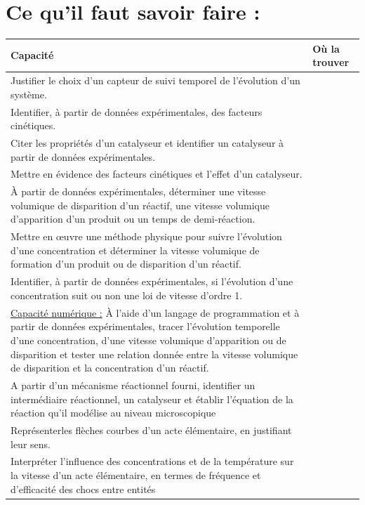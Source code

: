 \documentclass[a4paper,11pt,fleqn]{article}%
\begin{document}
\section*{Ce qu'il faut savoir faire :}
\begin{tabular}{|m{.8\linewidth}|>{\centering\arraybackslash}m{.15\linewidth}|}
    \hline \centering \textbf{Capacité} & \textbf{Où la trouver}\\
    \hline Justifier le choix d’un capteur de suivi temporel de l’évolution d’un système. & \\
    \hline Identifier, à partir de données expérimentales, des facteurs cinétiques. & \\
    \hline Citer les propriétés d’un catalyseur et identifier un catalyseur à partir de données expérimentales. & \\
    \hline Mettre en évidence des facteurs cinétiques et l’effet d’un catalyseur.& \\
    \hline À partir de données expérimentales, déterminer une vitesse volumique de disparition d’un réactif, une vitesse volumique d’apparition d’un produit ou un temps de demi-réaction. & \\
    \hline Mettre en œuvre une méthode physique pour suivre l’évolution d’une concentration et déterminer la vitesse volumique de formation d’un produit ou de disparition d’un réactif. & \\
    \hline Identifier, à partir de données expérimentales, si l’évolution d’une concentration suit ou non une loi de vitesse d’ordre 1. & \\
    \hline \underline{Capacité numérique :} À l’aide d’un langage de programmation et à partir de données expérimentales, tracer l’évolution temporelle d’une concentration, d’une vitesse volumique d’apparition ou de disparition et tester une relation donnée entre la vitesse volumique de disparition et
la concentration d’un réactif. & \\
    \hline A partir d'un mécanisme réactionnel fourni, identifier un intermédiaire réactionnel, un catalyseur et établir l'équation de la réaction qu'il modélise au niveau microscopique & \\
    \hline Représenterles flèches courbes d'un acte élémentaire, en justifiant leur sens. & \\
    \hline Interpréter l'influence des concentrations et de la température sur la vitesse d'un acte élémentaire, en termes de fréquence et d'efficacité des chocs entre entités&\\
    \hline
    \end{tabular}
\end{document}
